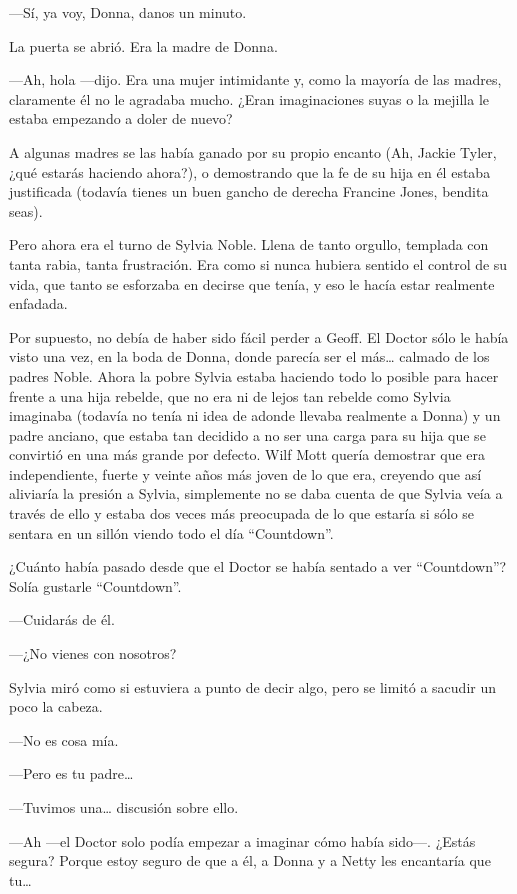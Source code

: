 ---Sí, ya voy, Donna, danos un minuto.

La puerta se abrió. Era la madre de Donna.

---Ah, hola ---dijo. Era una mujer intimidante y, como la mayoría de las
madres, claramente él no le agradaba mucho. ¿Eran imaginaciones suyas o
la mejilla le estaba empezando a doler de nuevo?

A algunas madres se las había ganado por su propio encanto (Ah, Jackie
Tyler, ¿qué estarás haciendo ahora?), o demostrando que la fe de su hija
en él estaba justificada (todavía tienes un buen gancho de derecha
 Francine Jones, bendita seas).

Pero ahora era el turno de Sylvia Noble. Llena de tanto orgullo,
templada con tanta rabia, tanta frustración. Era como si nunca hubiera
sentido el control de su vida, que tanto se esforzaba en decirse que
tenía, y eso le hacía estar realmente enfadada.

Por supuesto, no debía de haber sido fácil perder a Geoff. El Doctor
sólo le había visto una vez, en la boda de Donna, donde parecía ser el
más\ldots{} calmado de los padres Noble. Ahora la pobre Sylvia estaba
haciendo todo lo posible para hacer frente a una hija rebelde, que no
era ni de lejos tan rebelde como Sylvia imaginaba (todavía no tenía ni
idea de adonde llevaba realmente a Donna) y un padre anciano, que estaba
tan decidido a no ser una carga para su hija que se convirtió en una más
grande por defecto. Wilf Mott quería demostrar que era independiente,
fuerte y veinte años más joven de lo que era, creyendo que así aliviaría
la presión a Sylvia, simplemente no se daba cuenta de que Sylvia veía a
través de ello y estaba dos veces más preocupada de lo que estaría si
sólo se sentara en un sillón viendo todo el día ``Countdown''.

¿Cuánto había pasado desde que el Doctor se había sentado a ver
``Countdown''? Solía gustarle ``Countdown''.

---Cuidarás de él.

---¿No vienes con nosotros?

Sylvia miró como si estuviera a punto de decir algo, pero se limitó a
sacudir un poco la cabeza.

---No es cosa mía.

---Pero es tu padre\ldots{}

---Tuvimos una\ldots{} discusión sobre ello.

---Ah ---el Doctor solo podía empezar a imaginar cómo había sido---.
¿Estás segura? Porque estoy seguro de que a él, a Donna y a Netty les
encantaría que tu\ldots{}

